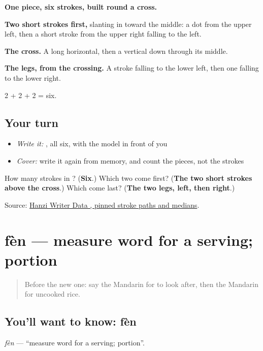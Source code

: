 \begin{quote}
\end{quote}

\textbf{One piece, six strokes, built round a cross.}

\textbf{Two short strokes first,} slanting in toward the middle: a dot from the upper left, then a short stroke from the upper right falling to the left.

\textbf{The cross.} A long horizontal, then a vertical down through its middle.

\textbf{The legs, from the crossing.} A stroke falling to the lower left, then one falling to the lower right.

2 + 2 + 2 = six.

\subsection*{Your turn}
\begin{itemize}
\raggedright
  \item \emph{Write it:} , all six, with the model in front of you
  \item \emph{Cover:} write it again from memory, and count the pieces, not the strokes
\end{itemize}

\begin{tcolorbox}[breakable,colback=teal!4,colframe=teal!35!black,title={Before you move on}]
How many strokes in ? (\textbf{Six}.) Which two come first? (\textbf{The two short strokes above the cross}.) Which come last? (\textbf{The two legs, left, then right}.)

Source: \href{https://raw.githubusercontent.com/chanind/hanzi-writer-data/68d10a4b21150cae5e1ebbd223eed289cf32d90c/data/\%E7\%B1\%B3.json}{Hanzi Writer Data , pinned stroke paths and medians}.
\end{tcolorbox}
\section[fèn]{fèn — measure word for a serving; portion}

\label{lesson:ZH-C161-fen}



\begin{quote}
Before the new one: say the Mandarin for to look after, then the Mandarin for uncooked rice.
\end{quote}

\subsection*{You'll want to know: fèn}
\emph{fèn} — \textquotedblleft{}measure word for a serving; portion\textquotedblright{}.

